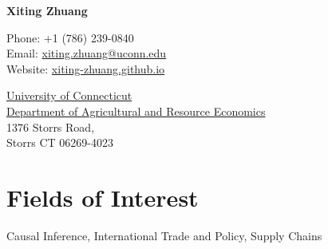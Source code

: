 \documentclass[10.5 pt,letterpaper]{article}
\def\name{Xiting Zhuang}
\begin{document}
	
	{\huge \textbf{\name}}
	
	
	\vspace{0.25in}
	
	\begin{minipage}[t]{0.45\textwidth}
		Phone: +1 (786) 239-0840 \\
		Email: \href{mailto:xiting.zhuang@uconn.edu}{xiting.zhuang@uconn.edu} \\
		Website: \href{https://xiting-zhuang.github.io}{xiting-zhuang.github.io} \\
		
	\end{minipage}
	\begin{minipage}[t]{0.6\textwidth}
		\href{https://uconn.edu/}{University of Connecticut} \\
		\href{https://are.uconn.edu/}{Department of Agricultural and Resource Economics} \\
		1376 Storrs Road,  	\\
		Storrs CT 06269-4023 
	\end{minipage}
	
	
		\section*{\textbf{Fields of Interest}}
	
	Causal Inference, International Trade and Policy,  Supply Chains 
	
	
\end{document}
